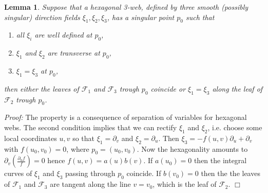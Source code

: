 \documentclass[11pt,a4paper]{article}
\newtheorem{lemma}[theorem]{Lemma}
\begin{document}
\begin{lemma}\label{sing}
Suppose that a hexagonal 3-web, defined by three smooth (possibly singular) direction fields $\xi_1,\xi_2,\xi_3$, has a singular point $p_0$ such that
\begin{enumerate}
\item all $\xi_i$ are well defined at $p_0$,
\item $\xi_1$ and $\xi_2$ are transverse at $p_0$,
\item $\xi_1=\xi_3$ at $p_0$, 
\end{enumerate}
then either the leaves of $\mathcal{F}_1$ and $\mathcal{F}_3$ trough $p_0$ coincide or 
$\xi_1=\xi_3$ along the leaf of  $\mathcal{F}_2$ trough $p_0$. 
\end{lemma}
{\it Proof:} The property is a consequence of separation of variables  for hexagonal webs. 
The second condition implies that we can rectify $\xi_1$ and $\xi_2$, i.e.  choose some local coordinates $u,v$ so that $\xi_1=\partial_v$ and $\xi_2=\partial_u$. Then $\xi_3=-f(u,v)\partial_u+\partial_v$ with $f(u_0,v_0)=0$, where $p_0=(u_0,v_0).$ Now the hexagonality amounts to $\partial_v\left(\frac{\partial_uf}{f}\right)=0$ hence $f(u,v)=a(u)b(v)$. 
If $a(u_0)=0$ then the integral curves of $\xi_1$ and $\xi_3$ passing through $p_0$ coincide. If $b(v_0)=0$ then the the leaves of $\mathcal{F}_1$ and $\mathcal{F}_3$ are tangent along the line $v=v_0$, which is the leaf of $\mathcal{F}_2$.   
\hfill $\Box$\\
\end{document}
